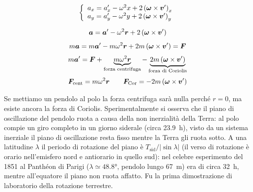 \[\left\{\begin{array}{l}
    a_x=a'_x-\omega^2 x+2\left(\boldsymbol{\omega}\times\boldsymbol{v}'\right)_x \\
    a_y=a'_y-\omega^2 y+2\left(\boldsymbol{\omega}\times\boldsymbol{v}'\right)_y \\
  \end{array}\right.\]

\[\boldsymbol{a}=\boldsymbol{a}'-\omega^2 \boldsymbol{r}+2\left(\boldsymbol{\omega}\times\boldsymbol{v}'\right)\]
\[m\boldsymbol{a}=m\boldsymbol{a}'-m\omega^2\boldsymbol{r}+2m\left(\boldsymbol{\omega}\times\boldsymbol{v}'\right)=\boldsymbol{F}\]
\[m\boldsymbol{a}'=\boldsymbol{F}+\underbrace{m\omega^2\boldsymbol{r}}_\text{forza centrifuga}-\underbrace{2m\left(\boldsymbol{\omega}\times\boldsymbol{v}'\right)}_\text{forza di Coriolis}\]
\[\boldsymbol{F}_\text{cent}=m\omega^2 \boldsymbol{r}\qquad \boldsymbol{F}_\text{Cor}=-2m\left(\boldsymbol{\omega}\times\boldsymbol{v}'\right)\]

\begin{Es}
  Se mettiamo un pendolo al polo la forza centrifuga sarà nulla perché $r=0$, ma esiste ancora la forza di Coriolis. Sperimentalmente si osserva che il piano di oscillazione del pendolo ruota a causa della non inerzialità della Terra: al polo compie un giro completo in un giorno siderale (circa \SI{23.9}{\hour}), visto da un sistema inerziale il piano di oscillazione resta fisso mentre la Terra gli ruota sotto. A una latitudine $\lambda$ il periodo di rotazione del piano è $T_\text{sid}/|\sin\lambda|$ (il verso di rotazione è orario nell'emisfero nord e antiorario in quello sud): nel celebre esperimento del 1851 al Panthéon di Parigi ($\lambda\simeq\ang{48.8}$, pendolo lungo \SI{67}{\meter}) era di circa \SI{32}{\hour}, mentre all'equatore il piano non ruota affatto. Fu la prima dimostrazione di laboratorio della rotazione terrestre.
\end{Es}
